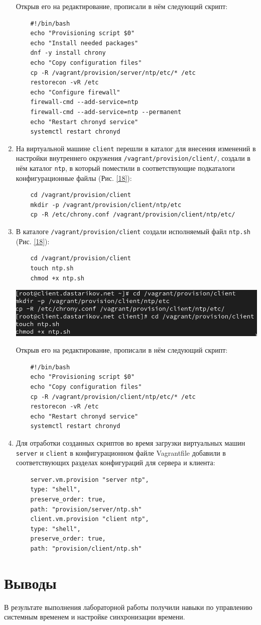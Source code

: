 \begin{enumerate}
  Открыв его на редактирование, прописали в нём следующий скрипт:
  \begin{verbatim}
    #!/bin/bash
    echo "Provisioning script $0"
    echo "Install needed packages"
    dnf -y install chrony
    echo "Copy configuration files"
    cp -R /vagrant/provision/server/ntp/etc/* /etc
    restorecon -vR /etc
    echo "Configure firewall"
    firewall-cmd --add-service=ntp
    firewall-cmd --add-service=ntp --permanent
    echo "Restart chronyd service"
    systemctl restart chronyd
  \end{verbatim}
\item На виртуальной машине \texttt{client} перешли в каталог для внесения изменений в настройки внутреннего окружения \texttt{/vagrant/provision/client/}, создали в нём каталог \texttt{ntp}, в который поместили в соответствующие подкаталоги конфигурационные файлы (Рис. \ref{18}):
  \begin{verbatim}
    cd /vagrant/provision/client
    mkdir -p /vagrant/provision/client/ntp/etc
    cp -R /etc/chrony.conf /vagrant/provision/client/ntp/etc/
  \end{verbatim}
\item В каталоге \texttt{/vagrant/provision/client} создали исполняемый файл \texttt{ntp.sh} (Рис. \ref{18}):
  \begin{verbatim}
    cd /vagrant/provision/client
    touch ntp.sh
    chmod +x ntp.sh
  \end{verbatim}
\begin{center}
    \centering
    \includegraphics[width=\textwidth]{../images/image18.png}
    \label{18}
\end{center}
  Открыв его на редактирование, прописали в нём следующий скрипт:
  \begin{verbatim}
    #!/bin/bash
    echo "Provisioning script $0"
    echo "Copy configuration files"
    cp -R /vagrant/provision/client/ntp/etc/* /etc
    restorecon -vR /etc
    echo "Restart chronyd service"
    systemctl restart chronyd
  \end{verbatim}
\item Для отработки созданных скриптов во время загрузки виртуальных машин \texttt{server} и \texttt{client} в конфигурационном файле Vagrantfile добавили в соответствующих разделах конфигураций для сервера и клиента:
  \begin{verbatim}
    server.vm.provision "server ntp",
    type: "shell",
    preserve_order: true,
    path: "provision/server/ntp.sh"
    client.vm.provision "client ntp",
    type: "shell",
    preserve_order: true,
    path: "provision/client/ntp.sh"
  \end{verbatim}
\end{enumerate}

\section{Выводы}
В результате выполнения лабораторной работы получили навыки по управлению системным временем и настройке синхронизации времени.

